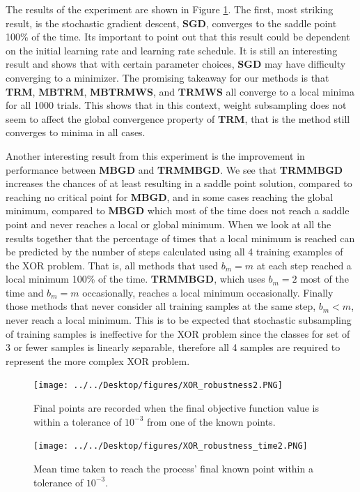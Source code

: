 \documentclass[letterpaper,12pt,titlepage,oneside,final]{book}
\begin{document}
	The results of the experiment are shown in Figure \ref{figure:XOR}. The first, most striking result, is the stochastic gradient descent, \textbf{SGD}, converges to the saddle point 100\% of the time. Its important to point out that this result could be dependent on the initial learning rate and learning rate schedule. It is still an interesting result and shows that with certain parameter choices, \textbf{SGD} may have difficulty converging to a minimizer. The promising takeaway for our methods is that \textbf{TRM}, \textbf{MBTRM}, \textbf{MBTRMWS}, and \textbf{TRMWS} all converge to a local minima for all 1000 trials. This shows that in this context, weight subsampling does not seem to affect the global convergence property of \textbf{TRM}, that is the method still converges to minima in all cases. 
	
	Another interesting result from this experiment is the improvement in performance between \textbf{MBGD} and \textbf{TRMMBGD}. We see that \textbf{TRMMBGD} increases the chances of at least resulting in a saddle point solution, compared to reaching no critical point for \textbf{MBGD}, and in some cases reaching the global minimum, compared to \textbf{MBGD} which most of the time does not reach a saddle point and never reaches a local or global minimum. When we look at all the results together that the percentage of times that a local minimum is reached can be predicted by the number of steps calculated using all 4 training examples of the XOR problem. That is, all methods that used $b_{m} = m$ at each step reached a local minimum 100\% of the time. \textbf{TRMMBGD}, which uses $b_{m} = 2$ most of the time and $b_{m} = m$ occasionally, reaches a local minimum occasionally. Finally those methods that never consider all training samples at the same step, $b_{m} < m$, never reach a local minimum. This is to be expected that stochastic subsampling of training samples is ineffective for the XOR problem since the classes for set of 3 or fewer samples is linearly separable, therefore all 4 samples are required to represent the more complex XOR problem.
	
	\begin{figure}[h]
		\centering
		\texttt{[image: ../../Desktop/figures/XOR\_robustness2.PNG]}
		\caption{Final points are recorded when the final objective function value is within a tolerance of $10^{-3}$ from one of the known points.}
		\label{figure:XOR}
	\end{figure}
	
	\begin{figure}[h]
		\centering
		\texttt{[image: ../../Desktop/figures/XOR\_robustness\_time2.PNG]}
		\caption{Mean time taken to reach the process' final known point within a tolerance of $10^{-3}$.}
		\label{figure:XOR_time}
	\end{figure}
	
\end{document}
